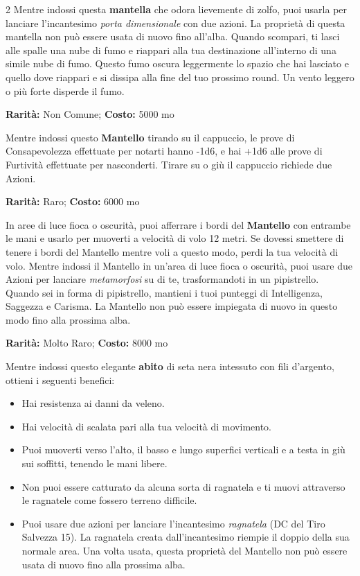 \begin{multicols}{2}
Mentre indossi questa \textbf{mantella} che odora lievemente di zolfo, puoi usarla per lanciare l'incantesimo \emph{porta dimensionale} con due azioni. La proprietà di questa mantella non può essere usata di nuovo fino all'alba. Quando scompari, ti lasci alle spalle una nube di fumo e riappari alla tua destinazione all'interno di una simile nube di fumo. Questo fumo oscura leggermente lo spazio che hai lasciato e quello dove riappari e si dissipa alla fine del tuo prossimo round. Un vento leggero o più forte disperde il fumo.


\textbf{Rarità:} Non Comune; \textbf{Costo:} 5000 mo

Mentre indossi questo \textbf{Mantello} tirando su il cappuccio, le prove di Consapevolezza effettuate per notarti hanno -1d6, e hai +1d6 alle prove di Furtività effettuate per nasconderti. Tirare su o giù il cappuccio richiede due Azioni.


\textbf{Rarità:} Raro; \textbf{Costo:} 6000 mo

In aree di luce fioca o oscurità, puoi afferrare i bordi del \textbf{Mantello} con entrambe le mani e usarlo per muoverti a velocità di volo 12 metri. Se dovessi smettere di tenere i bordi del Mantello mentre voli a questo modo, perdi la tua velocità di volo. Mentre indossi il Mantello in un'area di luce fioca o oscurità, puoi usare due Azioni per lanciare \emph{metamorfosi} su di te, trasformandoti in un pipistrello. Quando sei in forma di pipistrello, mantieni i tuoi punteggi di Intelligenza, Saggezza e Carisma. La Mantello non può essere impiegata di nuovo in questo modo fino alla prossima alba.


\textbf{Rarità:} Molto Raro; \textbf{Costo:} 8000 mo

Mentre indossi questo elegante \textbf{abito} di seta nera intessuto con fili d'argento, ottieni i seguenti benefici:

\medskip

\begin{itemize}[leftmargin=*] \setlength{\itemsep}{0pt}
\item
Hai resistenza ai danni da veleno.
\item
Hai velocità di scalata pari alla tua velocità di movimento.
\item
Puoi muoverti verso l'alto, il basso e lungo superfici verticali e a testa in giù sui soffitti, tenendo le mani libere.
\item
Non puoi essere catturato da alcuna sorta di ragnatela e ti muovi attraverso le ragnatele come fossero terreno difficile.
\item
Puoi usare due azioni per lanciare l'incantesimo \emph{ragnatela} (DC del Tiro Salvezza 15). La ragnatela creata dall'incantesimo riempie il doppio della sua normale area. Una volta usata, questa proprietà del Mantello non può essere usata di nuovo fino alla prossima alba.
\end{itemize}


\end{multicols}
